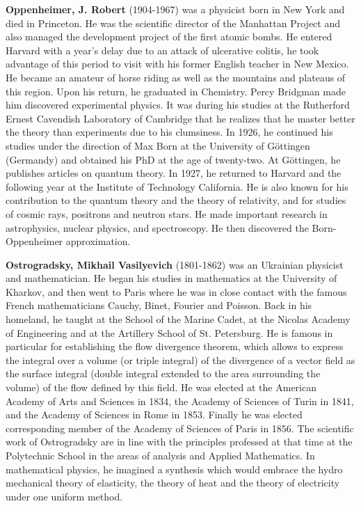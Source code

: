 \textbf{Oppenheimer, J. Robert} (1904-1967) was a physicist born in New York and died in Princeton. He was the scientific director of the Manhattan Project and also managed the development project of the first atomic bombs. He entered Harvard with a year's delay due to an attack of ulcerative colitis, he took advantage of this period to visit with his former English teacher in New Mexico. He became an amateur of horse riding as well as the mountains and plateaus of this region. Upon his return, he graduated in Chemistry. Percy Bridgman made him discovered experimental physics. It was during his studies at the Rutherford Ernest Cavendish Laboratory of Cambridge that he realizes that he master better the theory than experiments due to his clumsiness. In 1926, he continued his studies under the direction of Max Born at the University of Göttingen (Germandy) and obtained his PhD at the age of twenty-two. At Göttingen, he publishes articles on quantum theory. In 1927, he returned to Harvard and the following year at the Institute of Technology California. He is also known for his contribution to the quantum theory and the theory of relativity, and for studies of cosmic rays, positrons and neutron stars. He made important research in astrophysics, nuclear physics, and spectroscopy. He then discovered the Born-Oppenheimer approximation.

\textbf{Ostrogradsky, Mikhail Vasilyevich} (1801-1862) was an Ukrainian physicist and mathematician. He began his studies in mathematics at the University of Kharkov, and then went to Paris where he was in close contact with the famous French mathematicians Cauchy, Binet, Fourier and Poisson. Back in his homeland, he taught at the School of the Marine Cadet, at the Nicolas Academy of Engineering and at the Artillery School of St. Petersburg. He is famous in particular for establishing the flow divergence theorem, which allows to express the integral over a volume (or triple integral) of the divergence of a vector field as the surface integral (double integral extended to the area surrounding the volume) of the flow defined by this field. He was elected at the American Academy of Arts and Sciences in 1834, the Academy of Sciences of Turin in 1841, and the Academy of Sciences in Rome in 1853. Finally he was elected corresponding member of the Academy of Sciences of Paris in 1856. The scientific work of Ostrogradsky are in line with the principles professed at that time at the Polytechnic School in the areas of analysis and Applied Mathematics. In mathematical physics, he imagined a synthesis which would embrace the hydro mechanical theory of elasticity, the theory of heat and the theory of electricity under one uniform method.

